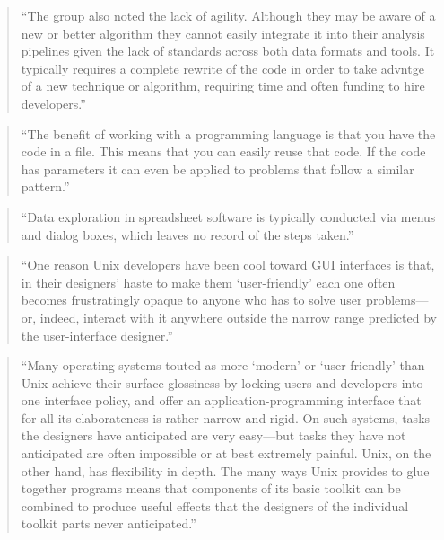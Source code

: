 \documentclass[]{tufte-book}
\begin{document}
\begin{quote}
``The group also noted the lack of agility. Although they may be aware of
a new or better algorithm they cannot easily integrate it into their
analysis pipelines given the lack of standards across both data formats
and tools. It typically requires a complete rewrite of the code in order
to take advntge of a new technique or algorithm, requiring time and often
funding to hire developers.'' \citep{barga2011bioinformatics}
\end{quote}

\begin{quote}
``The benefit of working with a programming language is that you have the code in
a file. This means that you can easily reuse that code. If the code has
parameters it can even be applied to problems that follow a similar pattern.''
\citep{janssens2014data}
\end{quote}

\begin{quote}
``Data exploration in spreadsheet software is typically conducted via menus and
dialog boxes, which leaves no record of the steps taken.'' \citep{murrell2009introduction}
\end{quote}

\begin{quote}
``One reason Unix developers have been cool toward GUI interfaces is that, in their
designers' haste to make them `user-friendly' each one often becomes frustratingly
opaque to anyone who has to solve user problems---or, indeed, interact with it anywhere
outside the narrow range predicted by the user-interface designer.'' \citep{raymond2003art}
\end{quote}

\begin{quote}
``Many operating systems touted as more `modern' or `user friendly' than Unix achieve their
surface glossiness by locking users and developers into one interface policy, and offer an
application-programming interface that for all its elaborateness is rather narrow and rigid.
On such systems, tasks the designers have anticipated are very easy---but tasks they have
not anticipated are often impossible or at best extremely painful. Unix, on the other hand, has
flexibility in depth. The many ways Unix provides to glue together programs means that components
of its basic toolkit can be combined to produce useful effects that the designers of the individual
toolkit parts never anticipated.'' \citep{raymond2003art}
\end{quote}
\end{document}
